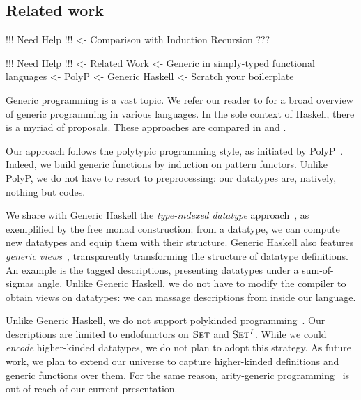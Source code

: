 \subsection{Related work}

\begin{wstructure}
!!! Need Help !!!
<- Comparison with Induction Recursion
    ???
\end{wstructure}


\begin{wstructure}
!!! Need Help !!!
<- Related Work
    <- Generic in simply-typed functional languages
        <- PolyP \cite{jansson:polyp}
        <- Generic Haskell \cite{hinze:generic-haskell}
        <- Scratch your boilerplate \cite{spj:syb}
\end{wstructure}

Generic programming is a vast topic. We refer our reader to
\citet{garcia:generic-comparative-study} for a broad overview of
generic programming in various languages. In the sole context of
Haskell, there is a myriad of proposals. These approaches are compared
in \citet{hinze:generic-approach-comparative} and
\citet{rodriguez:generic-libs-comparative}.

Our approach follows the polytypic programming style, as initiated
by PolyP~\cite{jansson:polyp}. Indeed, we build generic functions by
induction on pattern functors. Unlike PolyP, we do not have to resort
to preprocessing: our datatypes are, natively, nothing but codes.

We share with Generic Haskell the \emph{type-indexed datatype}
approach~\cite{hinze:generic-haskell}, as exemplified by the free
monad construction: from a datatype, we can compute new datatypes and
equip them with their structure. Generic Haskell also features
\emph{generic views}~\cite{holdermans:generic-view}, transparently
transforming the structure of datatype definitions. An example is the
tagged descriptions, presenting datatypes under a sum-of-sigmas
angle. Unlike Generic Haskell, we do not have to modify the compiler
to obtain views on datatypes: we can massage descriptions from inside
our language.

Unlike Generic Haskell, we do not support polykinded
programming~\cite{hinze:polytypic-polykinded}. Our descriptions are
limited to endofunctors on $\Set$ and $\Set^I$. While we could
\emph{encode} higher-kinded datatypes, we do not plan to adopt this
strategy. As future work, we plan to extend our universe to capture
higher-kinded definitions and generic functions over them. For the
same reason, arity-generic programming~\cite{weirich:arity-generic} is
out of reach of our current presentation.

